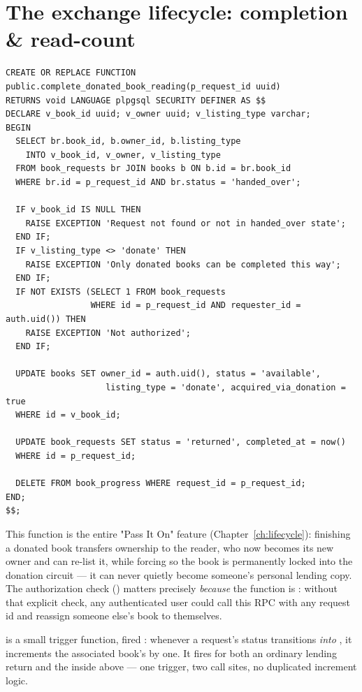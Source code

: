 \section{The exchange lifecycle: completion \& read-count}

\begin{lstlisting}[style=olkcodesql, caption={complete\_donated\_book\_reading — ownership transfer with an authorization check inline}]
CREATE OR REPLACE FUNCTION public.complete_donated_book_reading(p_request_id uuid)
RETURNS void LANGUAGE plpgsql SECURITY DEFINER AS $$
DECLARE v_book_id uuid; v_owner uuid; v_listing_type varchar;
BEGIN
  SELECT br.book_id, b.owner_id, b.listing_type
    INTO v_book_id, v_owner, v_listing_type
  FROM book_requests br JOIN books b ON b.id = br.book_id
  WHERE br.id = p_request_id AND br.status = 'handed_over';

  IF v_book_id IS NULL THEN
    RAISE EXCEPTION 'Request not found or not in handed_over state';
  END IF;
  IF v_listing_type <> 'donate' THEN
    RAISE EXCEPTION 'Only donated books can be completed this way';
  END IF;
  IF NOT EXISTS (SELECT 1 FROM book_requests
                 WHERE id = p_request_id AND requester_id = auth.uid()) THEN
    RAISE EXCEPTION 'Not authorized';
  END IF;

  UPDATE books SET owner_id = auth.uid(), status = 'available',
                    listing_type = 'donate', acquired_via_donation = true
  WHERE id = v_book_id;

  UPDATE book_requests SET status = 'returned', completed_at = now()
  WHERE id = p_request_id;

  DELETE FROM book_progress WHERE request_id = p_request_id;
END;
$$;
\end{lstlisting}

This function is the entire "Pass It On" feature (Chapter~\ref{ch:lifecycle}): finishing a donated book transfers ownership to the reader, who now becomes its new owner and can re-list it, while forcing  so the book is permanently locked into the donation circuit — it can never quietly become someone's personal lending copy. The authorization check () matters precisely \emph{because} the function is : without that explicit check, any authenticated user could call this RPC with any request id and reassign someone else's book to themselves.

 is a small trigger function, fired : whenever a request's status transitions \emph{into} , it increments the associated book's  by one. It fires for both an ordinary lending return and the  inside  above — one trigger, two call sites, no duplicated increment logic.

